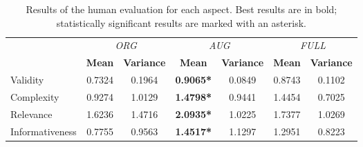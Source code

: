 \begin{table}[!t] %
    \centering
    \scriptsize
    \setlength{\tabcolsep}{2pt}  %
        \begin{tabular}{ lcccccc }
            \toprule
             &  
            \multicolumn{2}{c}{\textit{ORG}} & 
            \multicolumn{2}{c}{\textit{AUG}} &
            \multicolumn{2}{c}{\textit{FULL}}\\
            \cmidrule(lr){2-3} \cmidrule(lr){4-5} \cmidrule(lr){6-7}
            & \textbf{Mean} & \textbf{Variance} & \textbf{Mean} & \textbf{Variance} & \textbf{Mean} & \textbf{Variance} \\
            \midrule
            Validity & 0.7324 & 0.1964 & \textbf{0.9065*} & 0.0849 & 0.8743 & 0.1102 \\
            Complexity & 0.9274 & 1.0129 & \textbf{1.4798*} & 0.9441 & 1.4454 & 0.7025 \\
            Relevance & 1.6236 & 1.4716 & \textbf{2.0935*} & 1.0225 & 1.7377 & 1.0269\\
            Informativeness & 0.7755 & 0.9563 & \textbf{1.4517*} & 1.1297 & 1.2951 & 0.8223\\
            \bottomrule
        \end{tabular}
    \caption{Results of the human evaluation for each aspect. Best results are in bold; statistically significant results are marked with an asterisk.}
    \label{tab:mean_variance}
\end{table}